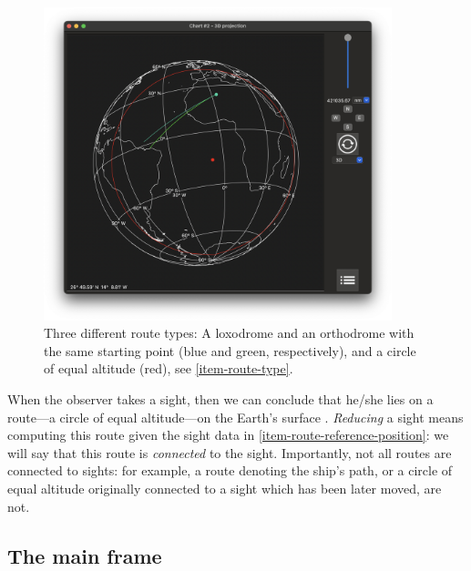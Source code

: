 \documentclass{ol-softwaremanual}
\begin{document}
\begin{figure}
  \centering
  \includegraphics[width=0.9\textwidth]{figures/route-types.png}
  \caption{
    \label{fig-route-types}
    Three different route types: A loxodrome and an orthodrome with the same starting point (blue and green, respectively), and a circle of equal altitude (red), see \cref{item-route-type}. 
  }
  \end{figure}


When the observer takes a sight, then we can conclude that he/she lies on a route---a circle of equal altitude---on the Earth's surface \cite{bowditch2002the}. 
\textit{Reducing} a sight means computing this route given the sight data in \cref{item-route-reference-position}: we will say that this route is \textit{connected} to the sight. Importantly, not all routes are connected to sights: for example, a route denoting the ship's path, or a circle of equal altitude originally connected to a sight which has been later moved, are not. 

\subsection{The main frame}
\end{document}
